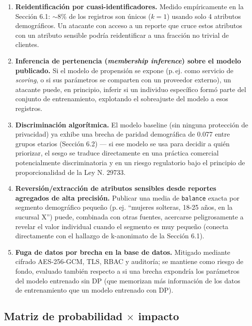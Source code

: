 \documentclass[11pt,a4paper]{article}
\begin{document}
\begin{enumerate}[leftmargin=1.4em]
\item \textbf{Reidentificación por cuasi-identificadores.} Medido empíricamente en la Sección 6.1:
$\sim$8\% de los registros son únicos ($k=1$) usando solo 4 atributos demográficos. Un atacante
con acceso a un reporte que cruce estos atributos con un atributo sensible podría reidentificar a
una fracción no trivial de clientes.
\item \textbf{Inferencia de pertenencia (\emph{membership inference}) sobre el modelo publicado.}
Si el modelo de propensión se expone (p.\,ej. como servicio de \emph{scoring}, o si sus
parámetros se comparten con un proveedor externo), un atacante puede, en principio, inferir si un
individuo específico formó parte del conjunto de entrenamiento, explotando el sobreajuste del
modelo a esos registros.
\item \textbf{Discriminación algorítmica.} El modelo baseline (sin ninguna protección de
privacidad) ya exhibe una brecha de paridad demográfica de 0.077 entre grupos etarios (Sección
6.2) --- si ese modelo se usa para decidir a quién priorizar, el sesgo se traduce directamente en
una práctica comercial potencialmente discriminatoria y en un riesgo regulatorio bajo el
principio de proporcionalidad de la Ley N.\textdegree{} 29733.
\item \textbf{Reversión/extracción de atributos sensibles desde reportes agregados de alta
precisión.} Publicar una media de \texttt{balance} exacta por segmento demográfico pequeño (p.\,ej.
``mujeres solteras, 18-25 años, en la sucursal X'') puede, combinada con otras fuentes, acercarse
peligrosamente a revelar el valor individual cuando el segmento es muy pequeño (conecta
directamente con el hallazgo de k-anonimato de la Sección 6.1).
\item \textbf{Fuga de datos por brecha en la base de datos.} Mitigado mediante cifrado
AES-256-GCM, TLS, RBAC y auditoría; se mantiene como riesgo de fondo, evaluado también respecto a
si una brecha expondría los parámetros del modelo entrenado sin DP (que memorizan más información
de los datos de entrenamiento que un modelo entrenado con DP).
\end{enumerate}

\subsection{Matriz de probabilidad $\times$ impacto}
\end{document}
